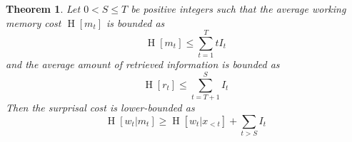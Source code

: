 \documentclass[11pt,letterpaper]{article}
\newcounter{theorem}
\newtheorem{thm}[theorem]{Theorem}
\begin{document}
\begin{thm}
Let $0 < S \leq T$ be positive integers such that the average working memory cost $\operatorname{H}[m_t]$ is bounded as
	\begin{equation}
		\operatorname{H}[m_t] \leq \sum_{t=1}^T t I_t
	\end{equation}
	and the average amount of retrieved information is bounded as
	\begin{equation}
		\operatorname{H}[r_t] \leq \sum_{t=T+1}^S I_t
	\end{equation} %
	Then the surprisal cost is lower-bounded as
	\begin{equation}
		\operatorname{H}[w_t|m_t] \geq \operatorname{H}[w_t|x_{<t}] + \sum_{t>S} I_t
	\end{equation}
\end{thm}
\end{document}
